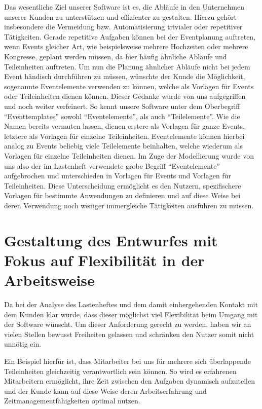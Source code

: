 Das wesentliche Ziel unserer Software ist es, die Abläufe in den Unternehmen unserer Kunden zu unterstützen und effizienter zu gestalten. Hierzu gehört insbesondere die Vermeidung bzw. Automatisierung trivialer oder repetitiver Tätigkeiten. Gerade repetitive Aufgaben können bei der Eventplanung auftreten, wenn Events gleicher Art, wie beispielsweise mehrere Hochzeiten oder mehrere Kongresse, geplant werden müssen, da hier häufig ähnliche Abläufe und Teileinheiten auftreten. Um nun die Planung ähnlicher Abläufe nicht bei jedem Event händisch durchführen zu müssen, wünschte der Kunde die Möglichkeit, sogenannte Eventelemente verwenden zu können, welche als Vorlagen für Events oder Teileinheiten dienen können. Dieser Gedanke wurde von uns aufgegriffen und noch weiter verfeinert. So kennt unsere Software unter dem Oberbegriff \enquote{Eventtemplates} sowohl \enquote{Eventelemente}, als auch \enquote{Teilelemente}. Wie die Namen bereits vermuten lassen, dienen erstere als Vorlagen für ganze Events, letztere als Vorlagen für einzelne Teileinheiten. Eventelemente können hierbei analog zu Events beliebig viele Teilelemente beinhalten, welche wiederum als Vorlagen für einzelne Teileinheiten dienen. Im Zuge der Modellierung wurde von uns also der im Lastenheft verwendete grobe Begriff \enquote{Eventelemente} aufgebrochen und unterschieden in Vorlagen für Events und Vorlagen für Teileinheiten. Diese Unterscheidung ermöglicht es den Nutzern, spezifischere Vorlagen für bestimmte Anwendungen zu definieren und auf diese Weise bei deren Verwendung noch weniger immergleiche Tätigkeiten ausführen zu müssen.

\section{Gestaltung des Entwurfes mit Fokus auf Flexibilität in der Arbeitsweise}
Da bei der Analyse des Lastenheftes und dem damit einhergehenden Kontakt mit dem Kunden klar wurde, dass dieser möglichst viel Flexibilität beim Umgang mit der Software wünscht. Um dieser Anforderung gerecht zu werden, haben wir an vielen Stellen bewusst Freiheiten gelassen und schränken den Nutzer somit nicht unnötig ein.

Ein Beispiel hierfür ist, dass Mitarbeiter bei uns für mehrere sich überlappende Teileinheiten gleichzeitig verantwortlich sein können. So wird es erfahrenen Mitarbeitern ermöglicht, ihre Zeit zwischen den Aufgaben dynamisch aufzuteilen und der Kunde kann auf diese Weise deren Arbeitserfahrung und Zeitmanagementfähigkeiten optimal nutzen.

